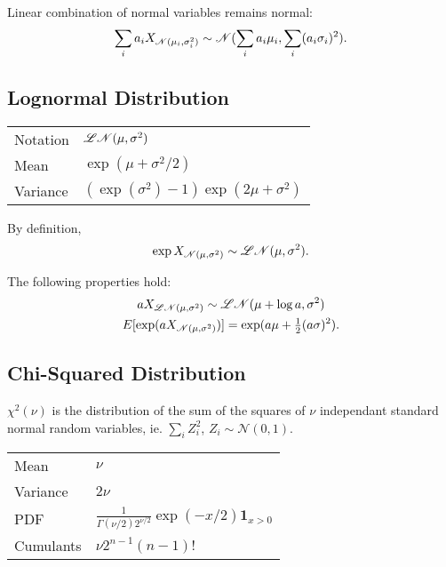 \begin{outline}
  \1 Linear combination of normal variables remains normal:
  \begin{equation*}
    \sum_i a_i X_{\mathscr{N}(\mu_i,\sigma^2_i)} \sim \mathscr{N}(\sum_ia_i\mu_i,\sum_i(a_i \sigma_i)^2).
  \end{equation*}
\end{outline}

\subsection{Lognormal Distribution}
\begin{center}
\begin{tabular}{ll}
  \toprule
  Notation & $\mathscr{LN}(\mu,\sigma^2)$\\
  Mean & $\exp(\mu+\sigma^2/2)$\\
  Variance & $(\exp(\sigma^2)-1)\exp(2\mu+\sigma^2)$\\
  \bottomrule
\end{tabular}
\end{center}

\begin{outline}
  \1 By definition,
  \begin{equation*}
    \exp X_{\mathscr{N}(\mu,\sigma^2)} \sim \mathscr{LN}(\mu,\sigma^2).
  \end{equation*}

  \1 The following properties hold:
  \begin{gather*}
    a X_{\mathscr{LN}(\mu,\sigma^2)} \sim \mathscr{LN}(\mu+\log a,\sigma^2)\\
    E[\exp(aX_{\mathscr{N}(\mu,\sigma^2)})] = \exp(a\mu + \tfrac{1}{2}(a\sigma)^2).
  \end{gather*}

\end{outline}


\subsection{Chi-Squared Distribution}
\begin{outline}
  \1 $\chi^2(\nu)$ is the distribution of the sum of the squares of $\nu$ independant
  standard normal random variables, ie. $\sum_i Z^2_i$, $Z_i\sim\mathscr{N}(0,1)$.

  \1 
  \begin{tabular}{ll} \toprule
    Mean & $\nu$\\
    Variance & $2\nu$\\
    PDF & $\displaystyle \frac{1}{\Gamma(\nu/2)2^{\nu/2}}\exp(-x/2) \bm
          1_{x>0}$\\
    Cumulants & $\nu 2^{n-1}(n-1)!$\\
    \bottomrule
  \end{tabular}
\end{outline}

